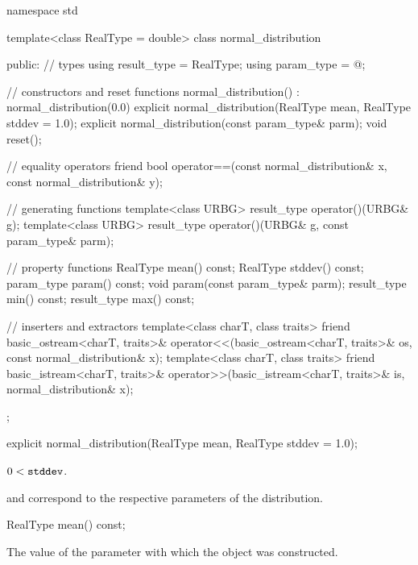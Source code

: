 %
%
\begin{codeblock}
namespace std {
  template<class RealType = double>
  class normal_distribution {
  public:
    // types
    using result_type = RealType;
    using param_type  = @\unspec@;

    // constructors and reset functions
    normal_distribution() : normal_distribution(0.0) {}
    explicit normal_distribution(RealType mean, RealType stddev = 1.0);
    explicit normal_distribution(const param_type& parm);
    void reset();

    // equality operators
    friend bool operator==(const normal_distribution& x, const normal_distribution& y);

    // generating functions
    template<class URBG>
      result_type operator()(URBG& g);
    template<class URBG>
      result_type operator()(URBG& g, const param_type& parm);

    // property functions
    RealType mean() const;
    RealType stddev() const;
    param_type param() const;
    void param(const param_type& parm);
    result_type min() const;
    result_type max() const;

    // inserters and extractors
    template<class charT, class traits>
      friend basic_ostream<charT, traits>&
        operator<<(basic_ostream<charT, traits>& os, const normal_distribution& x);
    template<class charT, class traits>
      friend basic_istream<charT, traits>&
        operator>>(basic_istream<charT, traits>& is, normal_distribution& x);
  };
}
\end{codeblock}


%
\begin{itemdecl}
explicit normal_distribution(RealType mean, RealType stddev = 1.0);
\end{itemdecl}

\begin{itemdescr}
\pnum
\expects
$0 < \tcode{stddev}$.

\pnum
\remarks
{} and 
correspond to the respective parameters of the distribution.
\end{itemdescr}

%
\begin{itemdecl}
RealType mean() const;
\end{itemdecl}

\begin{itemdescr}
\pnum
\returns
The value of the  parameter
 with which the object was constructed.
\end{itemdescr}

